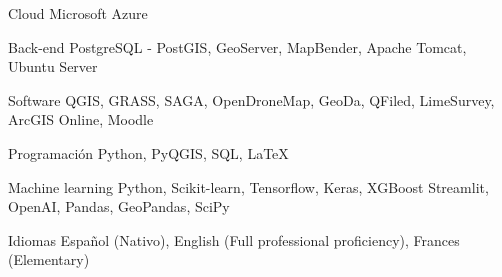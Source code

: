

\begin{cvskills}

  \cvskill
    {Cloud} %
    {Microsoft Azure} %

  \cvskill
    {Back-end} %
    {PostgreSQL - PostGIS, GeoServer, MapBender, Apache Tomcat,
    Ubuntu Server} %

  \cvskill
    {Software} %
    {QGIS, GRASS, SAGA, OpenDroneMap, GeoDa, QFiled, LimeSurvey,
    ArcGIS Online, Moodle} %

  \cvskill
    {Programación} %
    {Python, PyQGIS, SQL, \LaTeX} %

  \cvskill
    {Machine learning} %
    {Python, Scikit-learn, Tensorflow, Keras, XGBoost Streamlit, OpenAI, Pandas,
    GeoPandas, SciPy} %

  \cvskill
    {Idiomas} %
    {Español (Nativo),
    English (Full professional proficiency),
    Frances (Elementary)} %

\end{cvskills}
